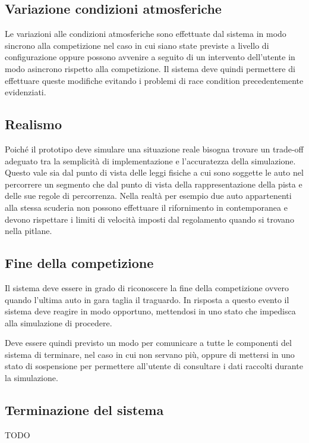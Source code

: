 \documentclass[11pt,a4paper]{report}
\begin{document}
\subsection*{Variazione condizioni atmosferiche}
Le variazioni alle condizioni atmosferiche sono effettuate dal sistema in modo sincrono alla competizione nel caso in cui siano state previste a livello di configurazione oppure possono avvenire a seguito di un intervento dell'utente in modo asincrono rispetto alla competizione. Il sistema deve quindi permettere di effettuare queste modifiche evitando i problemi di race condition precedentemente evidenziati.

\subsection*{Realismo}
Poiché il prototipo deve simulare una situazione reale bisogna trovare un trade-off adeguato tra la semplicità di implementazione e l'accuratezza della simulazione. Questo vale sia dal punto di vista delle leggi fisiche a cui sono soggette le auto nel percorrere un segmento che dal punto di vista della rappresentazione della pista e delle sue regole di percorrenza. Nella realtà per esempio due auto appartenenti alla stessa scuderia non possono effettuare il rifornimento in contemporanea e devono rispettare i limiti di velocità imposti dal regolamento quando si trovano nella pitlane.

\subsection*{Fine della competizione}
Il sistema deve essere in grado di riconoscere la fine della competizione ovvero quando l'ultima auto in gara taglia il traguardo. In risposta a questo evento il sistema deve reagire in modo opportuno, mettendosi in uno stato che impedisca alla simulazione di procedere.

Deve essere quindi previsto un modo per comunicare a tutte le componenti del sistema di terminare, nel caso in cui non servano più, oppure di mettersi in uno stato di sospensione per permettere all'utente di consultare i dati raccolti durante la simulazione.

\subsection*{Terminazione del sistema}
TODO
\end{document}
